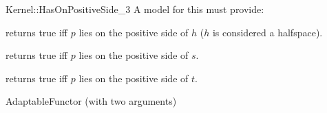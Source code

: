 \begin{ccRefFunctionObjectConcept}{Kernel::HasOnPositiveSide_3}
A model for this must provide:


{returns true iff $p$ lies on the positive side of $h$ 
($h$ is considered a halfspace).}

{returns true iff $p$ lies on the positive side of $s$.}

{returns true iff $p$ lies on the positive side of $t$.}

\ccRefines
AdaptableFunctor (with two arguments)

\ccSeeAlso
{} \\
 \\
 \\

\end{ccRefFunctionObjectConcept}
